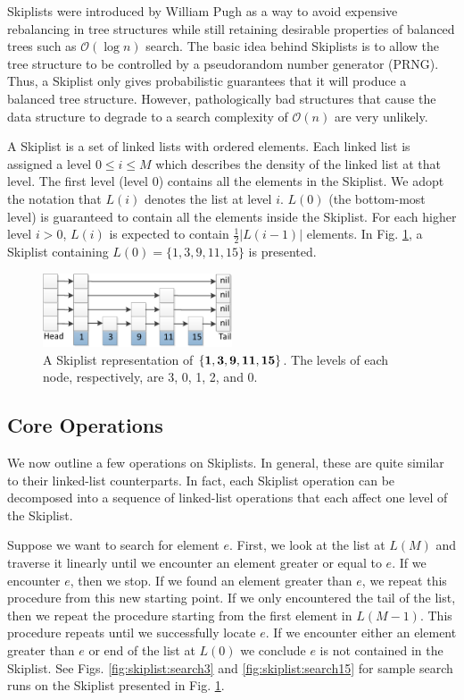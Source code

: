 \documentclass{acm_proc_article-sp}
\begin{document}
Skiplists were introduced by William Pugh \cite{pugh90} as a way
to avoid expensive rebalancing in tree structures while
still retaining desirable properties of balanced
trees such as $\mathcal{O}(\log n)$ search. The basic
idea behind Skiplists is to allow the tree structure
to be controlled by a pseudorandom number generator (PRNG). Thus,
a Skiplist only gives probabilistic guarantees that it will
produce a balanced tree structure.
However, pathologically bad structures that cause the data structure to degrade
to a search complexity of $\mathcal{O}(n)$ are very unlikely.

A Skiplist is a set of linked lists with ordered elements.
Each linked list is assigned a level $0 \leq i \leq M$ which describes
the density of the linked list at that level. The first
level (level 0) contains all the elements in the Skiplist.  We
adopt the notation that $L(i)$ denotes the list at level
$i$. $L(0)$ (the bottom-most level) is guaranteed to 
contain all the elements inside the Skiplist. For each higher level
$i > 0$, $L(i)$
is expected to contain $\frac{1}{2}|L(i-1)|$ elements.
In Fig. \ref{fig:skiplist}, a Skiplist containing
$L(0) = \{1,3,9,11,15\}$ is presented.

\begin{figure}[H]
  \includegraphics[width=0.5\textwidth]{img/skiplist-crop.pdf}
  \caption{A Skiplist representation of $\bf \{1,3,9,11,15\}$. The levels of
each node, respectively, are 3, 0, 1, 2, and 0.}
  \label{fig:skiplist}
\end{figure}

\subsection{Core Operations}

We now outline a few operations on Skiplists. In general, these are
quite similar to their linked-list counterparts. In fact, each Skiplist
operation can be decomposed into a sequence of linked-list operations that
each affect
one level of the Skiplist.

Suppose we want to search for element $e$. First,
we look at the list at $L(M)$ and traverse it linearly until we encounter
an element greater or equal to $e$.  If we encounter $e$, then we stop.
If we found an element greater than $e$, we repeat this procedure from
this new starting point. If we only encountered the tail of the list, then we
repeat the procedure starting from the first element in $L(M-1)$. This procedure
repeats until we successfully locate $e$. If we encounter either an element
greater than $e$ or end of the list at $L(0)$ we conclude $e$ is
not contained in the Skiplist. See Figs. \ref{fig:skiplist:search3} and \ref{fig:skiplist:search15}
for sample search runs on the Skiplist presented in Fig. \ref{fig:skiplist}.
\end{document}
